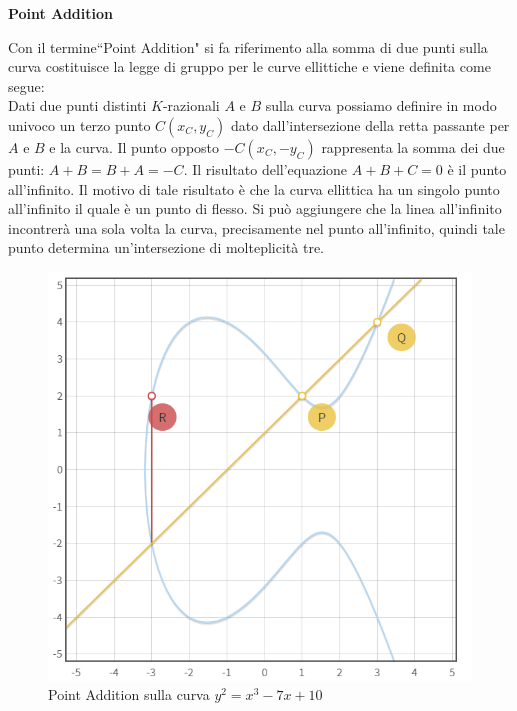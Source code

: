 \documentclass[a4paper,12pt]{tesiinfo}
\begin{document}
\begin{center}
\textbf{Point Addition}
\end{center}
Con il termine``Point Addition" si fa riferimento alla somma di due punti sulla curva costituisce la legge di gruppo per le curve ellittiche e viene definita come segue: 
\\
Dati due punti distinti $K$-razionali $A$ e $B$ sulla curva possiamo definire in modo univoco un terzo punto $C(x_C, y_C)$ dato dall'intersezione della retta passante per $A$ e $B$ e la curva. Il punto opposto $-C(x_C, -y_C)$ rappresenta la somma dei due punti: $A + B = B+ A = -C$. Il risultato dell'equazione $A+B+C = 0$ \`e il punto all'infinito. Il motivo di tale risultato \`e che la curva ellittica ha un singolo punto all'infinito il quale \`e un punto di flesso. Si pu\`o aggiungere che la linea all'infinito incontrer\`a una sola volta la curva, precisamente nel punto all'infinito, quindi tale punto determina un'intersezione di molteplicit\`a tre.
\begin{figure}[H]
  \includegraphics[width=.75\textwidth,center]{PA_P+Q}
  \caption{Point Addition sulla curva $y^2 = x^3-7x+10$}
\end{figure}
\end{document}
